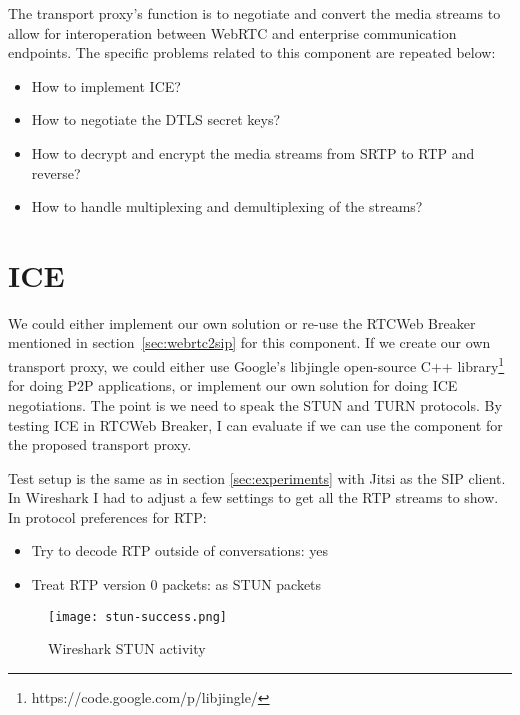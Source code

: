 The transport proxy's function is to negotiate and convert the media streams to allow for interoperation between WebRTC and enterprise communication endpoints. The specific problems related to this component are repeated below:

\begin{itemize}
\item{How to implement ICE?}
\item{How to negotiate the DTLS secret keys?}
\item{How to decrypt and encrypt the media streams from SRTP to RTP and reverse?}
\item{How to handle multiplexing and demultiplexing of the streams?}
\end{itemize}


\section{ICE}
We could either implement our own solution or re-use the RTCWeb Breaker mentioned in section~\ref{sec:webrtc2sip} for this component. If we create our own transport proxy, we could either use Google's libjingle open-source C++ library\footnote{https://code.google.com/p/libjingle/} for doing P2P applications, or implement our own solution for doing ICE negotiations. The point is we need to speak the STUN and TURN protocols. By testing ICE in RTCWeb Breaker, I can evaluate if we can use the component for the proposed transport proxy.

Test setup is the same as in section \ref{sec:experiments} with Jitsi as the SIP client. In Wireshark I had to adjust a few settings to get all the RTP streams to show. In protocol preferences for RTP:
\begin{itemize}
\item Try to decode RTP outside of conversations: yes
\item Treat RTP version 0 packets: as STUN packets
\end{itemize}

\begin{figure}[here]
\centerline{\texttt{[image: stun-success.png]}}
\caption{Wireshark STUN activity}
\label{fig:wireshark-stun-activity}
\end{figure}

